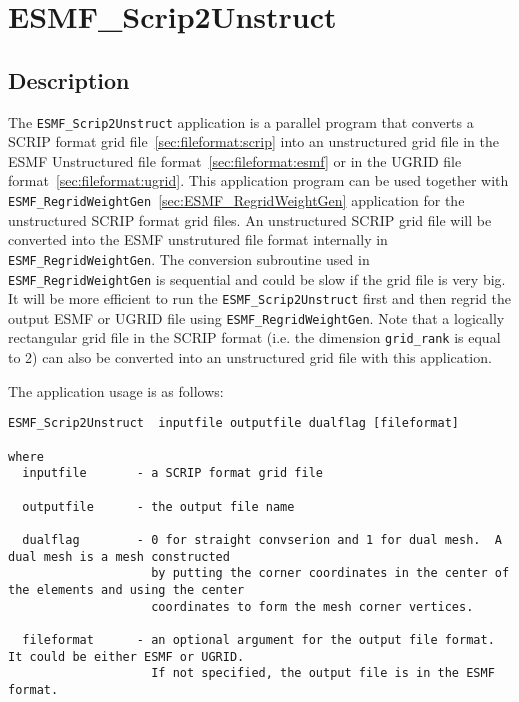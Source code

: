 
\section{ESMF\_Scrip2Unstruct}
\label{sec:ESMF_Scrip2Unstruct}

\subsection{Description}

The {\tt ESMF\_Scrip2Unstruct} application is a parallel program that converts a SCRIP format grid file~\ref{sec:fileformat:scrip} into an unstructured grid file in the ESMF Unstructured file format~\ref{sec:fileformat:esmf} or in the UGRID file format~\ref{sec:fileformat:ugrid}. This application program can be used together with {\tt ESMF\_RegridWeightGen}~\ref{sec:ESMF_RegridWeightGen} application for the unstructured SCRIP format grid files.  An unstructured SCRIP grid file will be converted into the ESMF unstrutured file format internally in {\tt ESMF\_RegridWeightGen}.  The conversion subroutine used in {\tt ESMF\_RegridWeightGen} is sequential and could be slow if the grid file is very big.  It will be more efficient to run the {\tt ESMF\_Scrip2Unstruct} first and then regrid the output ESMF or UGRID file using {\tt ESMF\_RegridWeightGen}.  Note that a logically rectangular grid file in the SCRIP format (i.e. the dimension {\tt grid\_rank} is equal to 2) can also be converted into an unstructured grid file with this application.   

The application usage is as follows:

\begin{verbatim}
ESMF_Scrip2Unstruct  inputfile outputfile dualflag [fileformat]

where
  inputfile       - a SCRIP format grid file

  outputfile      - the output file name
 
  dualflag        - 0 for straight convserion and 1 for dual mesh.  A dual mesh is a mesh constructed 
                    by putting the corner coordinates in the center of the elements and using the center
                    coordinates to form the mesh corner vertices.

  fileformat      - an optional argument for the output file format.  It could be either ESMF or UGRID.
                    If not specified, the output file is in the ESMF format.  
  
\end{verbatim}
